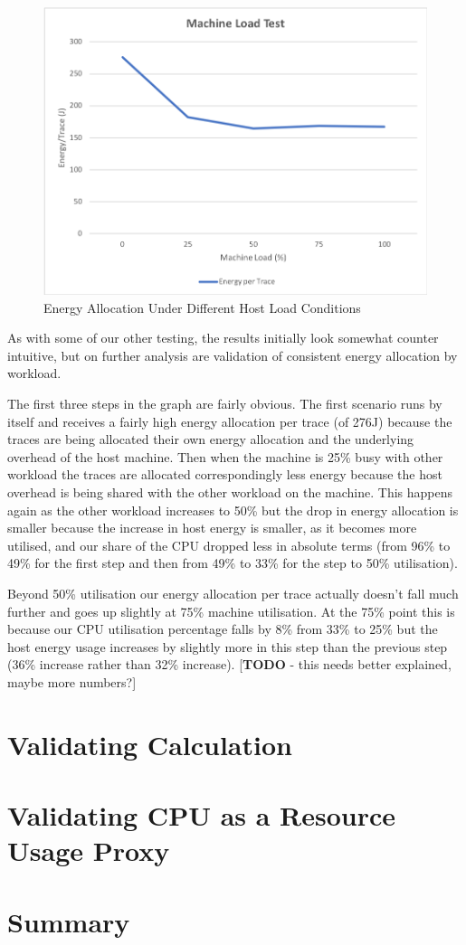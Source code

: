 \begin{figure}
\centering
\includegraphics[width=1.0\textwidth]{Figures/validation-machineload}
\caption{Energy Allocation Under Different Host Load Conditions}
\label{figure:validation-machineload}
\end{figure}

As with some of our other testing, the results initially look somewhat counter intuitive, but on further analysis are validation of consistent energy allocation by workload.

The first three steps in the graph are fairly obvious.  The first scenario runs by itself and receives a fairly high energy allocation per trace (of 276J) because the traces are being allocated their own energy allocation and the underlying overhead of the host machine.  Then when the machine is 25\% busy with other workload the traces are allocated correspondingly less energy because the host overhead is being shared with the other workload on the machine.  This happens again as the other workload increases to 50\% but the drop in energy allocation is smaller because the increase in host energy is smaller, as it becomes more utilised, and our share of the CPU dropped less in absolute terms (from 96\% to 49\% for the first step and then from 49\% to 33\% for the step to 50\% utilisation).

Beyond 50\% utilisation our energy allocation per trace actually doesn't fall much further and goes up slightly at 75\% machine utilisation.  At the 75\% point this is because our CPU utilisation percentage falls by 8\% from 33\% to 25\% but the host energy usage increases by slightly more in this step than the previous step (36\% increase rather than 32\% increase). [\textbf{TODO} - this needs better explained, maybe more numbers?]



\section{Validating Calculation}

\section{Validating CPU as a Resource Usage Proxy}

\section{Summary}

